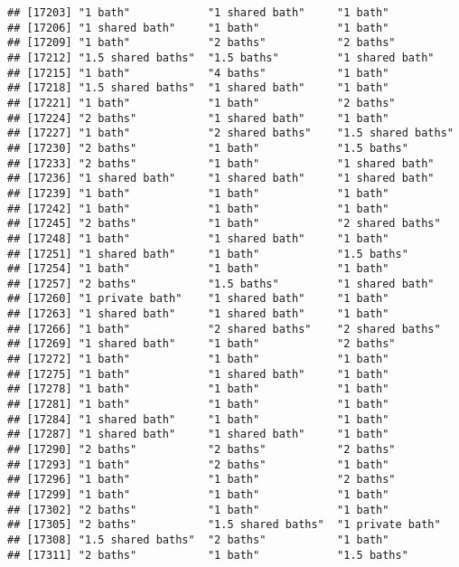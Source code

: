 \documentclass[
]{article}
\begin{document}
\begin{verbatim}
## [17203] "1 bath"            "1 shared bath"     "1 bath"           
## [17206] "1 shared bath"     "1 bath"            "1 bath"           
## [17209] "1 bath"            "2 baths"           "2 baths"          
## [17212] "1.5 shared baths"  "1.5 baths"         "1 shared bath"    
## [17215] "1 bath"            "4 baths"           "1 bath"           
## [17218] "1.5 shared baths"  "1 shared bath"     "1 bath"           
## [17221] "1 bath"            "1 bath"            "2 baths"          
## [17224] "2 baths"           "1 shared bath"     "1 bath"           
## [17227] "1 bath"            "2 shared baths"    "1.5 shared baths" 
## [17230] "2 baths"           "1 bath"            "1.5 baths"        
## [17233] "2 baths"           "1 bath"            "1 shared bath"    
## [17236] "1 shared bath"     "1 shared bath"     "1 shared bath"    
## [17239] "1 bath"            "1 bath"            "1 bath"           
## [17242] "1 bath"            "1 bath"            "1 bath"           
## [17245] "2 baths"           "1 bath"            "2 shared baths"   
## [17248] "1 bath"            "1 shared bath"     "1 bath"           
## [17251] "1 shared bath"     "1 bath"            "1.5 baths"        
## [17254] "1 bath"            "1 bath"            "1 bath"           
## [17257] "2 baths"           "1.5 baths"         "1 shared bath"    
## [17260] "1 private bath"    "1 shared bath"     "1 bath"           
## [17263] "1 shared bath"     "1 shared bath"     "1 bath"           
## [17266] "1 bath"            "2 shared baths"    "2 shared baths"   
## [17269] "1 shared bath"     "1 bath"            "2 baths"          
## [17272] "1 bath"            "1 bath"            "1 bath"           
## [17275] "1 bath"            "1 shared bath"     "1 bath"           
## [17278] "1 bath"            "1 bath"            "1 bath"           
## [17281] "1 bath"            "1 bath"            "1 bath"           
## [17284] "1 shared bath"     "1 bath"            "1 bath"           
## [17287] "1 shared bath"     "1 shared bath"     "1 bath"           
## [17290] "2 baths"           "2 baths"           "2 baths"          
## [17293] "1 bath"            "2 baths"           "1 bath"           
## [17296] "1 bath"            "1 bath"            "2 baths"          
## [17299] "1 bath"            "1 bath"            "1 bath"           
## [17302] "2 baths"           "1 bath"            "1 bath"           
## [17305] "2 baths"           "1.5 shared baths"  "1 private bath"   
## [17308] "1.5 shared baths"  "2 baths"           "1 bath"           
## [17311] "2 baths"           "1 bath"            "1.5 baths"        

\end{verbatim}
\end{document}
